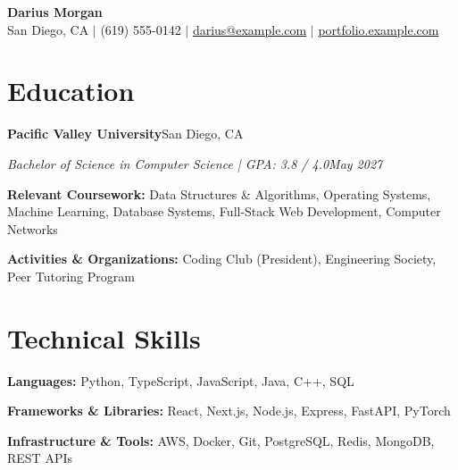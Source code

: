 \documentclass[letterpaper,10pt]{article}
\newcommand{\entry}[2]{\noindent\textbf{#1}\hfill #2\par}
\newcommand{\role}[2]{\noindent\textit{#1}\hfill\textit{#2}\par}
\begin{document}
\begin{center}
{\Huge\bfseries Darius Morgan}\\[3pt]
San Diego, CA $|$ (619) 555-0142 $|$
\href{mailto:darius@example.com}{darius@example.com} $|$
\href{https://portfolio.example.com}{portfolio.example.com}
\end{center}
\vspace{-8pt}

\section{Education}
\entry{Pacific Valley University}{San Diego, CA}
\role{Bachelor of Science in Computer Science | GPA: 3.8 / 4.0}{May 2027}
\textbf{Relevant Coursework:} Data Structures \& Algorithms, Operating Systems, Machine Learning, Database Systems, Full-Stack Web Development, Computer Networks\par
\textbf{Activities \& Organizations:} Coding Club (President), Engineering Society, Peer Tutoring Program\par
\section{Technical Skills}
\textbf{Languages:} Python, TypeScript, JavaScript, Java, C++, SQL\par
\textbf{Frameworks \& Libraries:} React, Next.js, Node.js, Express, FastAPI, PyTorch\par
\textbf{Infrastructure \& Tools:} AWS, Docker, Git, PostgreSQL, Redis, MongoDB, REST APIs\par
\end{document}
